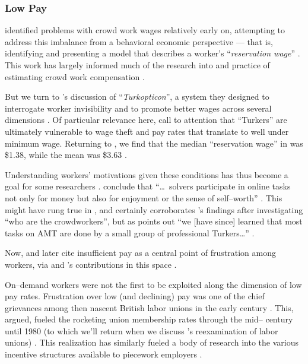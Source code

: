 \documentclass[trackingWork]{subfiles}
\begin{document}
{\subsubsection{Low Pay}\label{sec:lowPay}


\citeauthor{laborEconomicsOfCrowdsourcingHorton}
identified problems with crowd work wages relatively early on,
attempting to address this imbalance from a behavioral economic perspective ---
that is, identifying and presenting a model that describes a worker's
``\textit{reservation wage}''
\cite{laborEconomicsOfCrowdsourcingHorton}.
This work has largely informed much of the research into and practice of estimating crowd work compensation
\cite{incentivesShaw,paolacci2010running}.

But we turn to \citeauthor{turkopticon}'s discussion of ``\textit{Turkopticon}'',
a system they designed to interrogate worker invisibility and to promote better wages across several dimensions
\cite{turkopticon}.
Of particular relevance here,
\citeauthor{turkopticon} call to attention that ``Turkers'' are ultimately vulnerable to
wage theft and
pay rates that translate to well under minimum wage.
Returning to \citeauthor{laborEconomicsOfCrowdsourcingHorton},
we find that the median ``reservation wage'' in \citeyear{laborEconomicsOfCrowdsourcingHorton}
was \$1.38, while the mean was \$3.63
\cite{laborEconomicsOfCrowdsourcingHorton}.

Understanding workers' motivations given these conditions has thus become a goal for some researchers
\cite{whyWouldAnyoneBrewer}.
\citeauthor{Sun20111033} conclude that
``\dots~solvers participate in online tasks
not only for money
but also for enjoyment
or the sense of self--worth''
\cite{Sun20111033}.
This might have rung true in \citeyear{Sun20111033},
and certainly corroborates \citeauthor{Ross}'s findings after investigating
``who are the crowdworkers'',
but as \citeauthor{whoareNOTtheTurkers} points out
``we [have since] learned that most tasks on AMT are done by a small group of professional Turkers\dots''
\cite{Ross,whoareNOTtheTurkers}.

Now, \citeauthor{turkopticon}
and later
\citeauthor{dynamo} cite insufficient pay as a central point of frustration among workers,
via \citeauthor{irani2015cultural} and \citeauthor{dawnDigitalSweatshopCushing}'s contributions in this space
\cite{dynamo,irani2015cultural,dawnDigitalSweatshopCushing,turkopticon}.

On--demand workers were not the first to be exploited along the dimension of low pay rates.
Frustration over low (and declining) pay was one of the chief grievances among then nascent
British labor unions in the early  century
\cite{turner1952trade}.
This, \citeauthor{ebbinghaus1999institutions} argued,
fueled the rocketing union membership rates through the mid-- century until 1980
(to which we'll return when we discuss \citeauthor{levi2009union}'s reexamination of labor unions)
\cite{ebbinghaus1999institutions,levi2009union}.
This realization has similarly fueled a body of research into
the various incentive structures available to piecework employers
\cite{roy1953work}.


}
\end{document}
